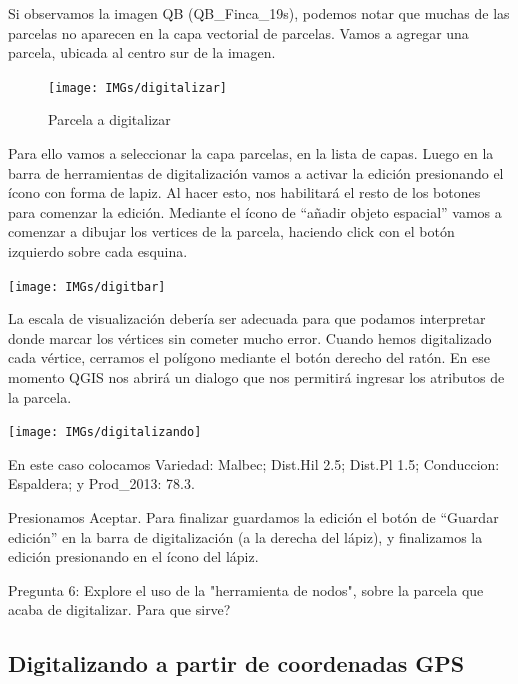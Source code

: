 \documentclass[onecolumn]{article}
\begin{document}
Si observamos la imagen QB (QB\_Finca\_19s), podemos notar que muchas de las parcelas no aparecen en la capa vectorial de parcelas. Vamos a agregar una parcela, ubicada al centro sur de la imagen. 

\begin{figure}[h]
	\centering
	\texttt{[image: IMGs/digitalizar]}
	\caption{Parcela a digitalizar}
	\label{fig:interfaz}
\end{figure}

Para ello vamos a seleccionar la capa parcelas, en la lista de capas. Luego en la barra de herramientas de digitalización vamos a activar la edición presionando el ícono con forma de lapiz. Al hacer esto, nos habilitará el resto de los botones para comenzar la edición. Mediante el ícono de “añadir objeto espacial” vamos a comenzar a dibujar los vertices de la parcela, haciendo click con el botón izquierdo sobre cada esquina. 

\begin{center}
	\texttt{[image: IMGs/digitbar]}
\end{center}

La escala de visualización debería ser adecuada para que podamos interpretar donde marcar los vértices sin cometer mucho error. Cuando hemos digitalizado cada vértice, cerramos el polígono mediante el botón derecho del ratón.
En ese momento QGIS nos abrirá un dialogo que nos permitirá ingresar los atributos de la parcela.

\begin{center}
	\texttt{[image: IMGs/digitalizando]}
\end{center}

En este caso colocamos Variedad: Malbec; Dist.Hil 2.5; Dist.Pl 1.5; Conduccion: Espaldera; y Prod\_2013: 78.3.

Presionamos Aceptar. Para finalizar guardamos la edición el botón de “Guardar edición” en la barra de digitalización (a la derecha del lápiz), y finalizamos la edición presionando en el ícono del lápiz.

\begin{mdframed}[]
	Pregunta 6: Explore el uso de la "herramienta de nodos", sobre la parcela que acaba de digitalizar. Para que sirve?
\end{mdframed}


\subsection{Digitalizando a partir de coordenadas GPS}
\end{document}
